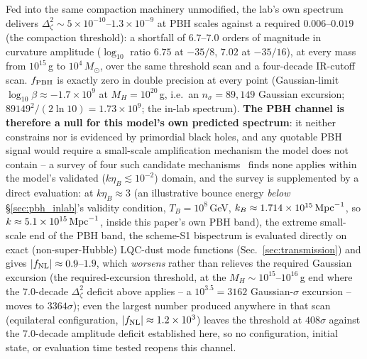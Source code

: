 \documentclass[aps,prd,twocolumn,superscriptaddress,nofootinbib,longbibliography]{revtex4-2}
\newcommand{\fnl}{f_{\rm NL}}
\newcommand{\fpbh}{f_{\rm PBH}}
\begin{document}
Fed into the same compaction machinery unmodified, the lab's own spectrum
delivers $\Delta_\zeta^2\sim5\times10^{-10}$--$1.3\times10^{-9}$ at PBH
scales against a required $0.006$--$0.019$ (the compaction threshold): a
shortfall of $6.7$--$7.0$ orders of magnitude in curvature amplitude
($\log_{10}$ ratio $6.75$ at $-35/8$, $7.02$ at $-35/16$), at every mass
from $10^{15}\,$g to $10^4\,M_\odot$, over
the same threshold scan and a four-decade IR-cutoff scan. $\fpbh$ is exactly
zero in double precision at every point (Gaussian-limit
$\log_{10}\beta\approx-1.7\times10^9$ at $M_H=10^{20}\,$g, i.e.\ an
$n_\sigma=89{,}149$ Gaussian excursion; $89149^2/(2\ln10)=1.73\times10^9$;
the in-lab spectrum). \textbf{The PBH
channel is therefore a null for this model's own predicted spectrum}: it
neither constrains nor is evidenced by primordial black holes, and any
quotable PBH signal would require a small-scale amplification mechanism the
model does not contain -- a survey of four such candidate
mechanisms~\cite{Quintin2015,AgulloBolliet2017} finds none applies within the
model's validated ($k\eta_B\lesssim10^{-2}$) domain, and the survey is
supplemented by a direct evaluation: at $k\eta_B\approx3$ (an illustrative bounce
energy \emph{below} \S\ref{sec:pbh_inlab}'s validity condition,
$T_B=10^8\,$GeV, $k_B\approx1.714\times10^{15}\,{\rm Mpc}^{-1}$, so
$k\approx5.1\times10^{15}\,{\rm Mpc}^{-1}$,
inside this paper's own PBH band), the extreme small-scale
end of the PBH band, the scheme-S1 bispectrum is evaluated
directly on exact (non-super-Hubble) LQC-dust mode functions
(Sec.~\ref{sec:transmission}) and gives $|\fnl|\approx0.9$--$1.9$, which
\emph{worsens} rather than relieves the required Gaussian excursion
(the required-excursion threshold, at the $M_H\sim10^{15}$--$10^{16}\,$g
end where the $7.0$-decade $\Delta_\zeta^2$ deficit above applies --
a $10^{3.5}=3162$ Gaussian-$\sigma$ excursion -- moves to
$3364\sigma$); even the largest number produced anywhere in that scan
(equilateral configuration, $|\fnl|\approx1.2\times10^3$) leaves the
threshold at $408\sigma$ against the $7.0$-decade amplitude deficit
established here, so no configuration, initial state, or evaluation time
tested reopens this channel.
\end{document}
